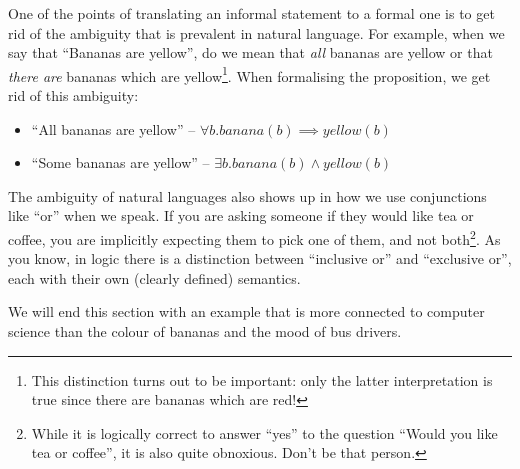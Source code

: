 \documentclass{tufte-handout}
\newcounter{example}
\begin{document}
One of the points of translating an informal statement to a formal
one is to get rid of the ambiguity that is prevalent in natural
language. For example, when we say that ``Bananas are yellow'', do
we mean that \emph{all} bananas are yellow or that \emph{there
  are} bananas which are yellow\footnote{This distinction turns
  out to be important: only the latter interpretation is true
  since there are bananas which are red!}. When formalising the
proposition, we get rid of this ambiguity:

\begin{itemize}
\item ``All bananas are yellow'' -- $\forall b. \mathit{banana}(b) \implies \mathit{yellow}(b)$
\item ``Some bananas are yellow'' -- $\exists b. \mathit{banana}(b) \land \mathit{yellow}(b)$
\end{itemize}

\noindent
The ambiguity of natural languages also shows up in how we use
conjunctions like ``or'' when we speak. If you are asking someone
if they would like tea or coffee, you are implicitly expecting
them to pick one of them, and not both\footnote{While it is
  logically correct to answer ``yes'' to the question ``Would you
  like tea or coffee'', it is also quite obnoxious. Don't be that
  person. }. As you know, in logic there is a distinction between
``inclusive or'' and ``exclusive or'', each with their own
(clearly defined) semantics.

We will end this section with an example that is more connected to
computer science than the colour of bananas and the mood of bus
drivers.
\end{document}
